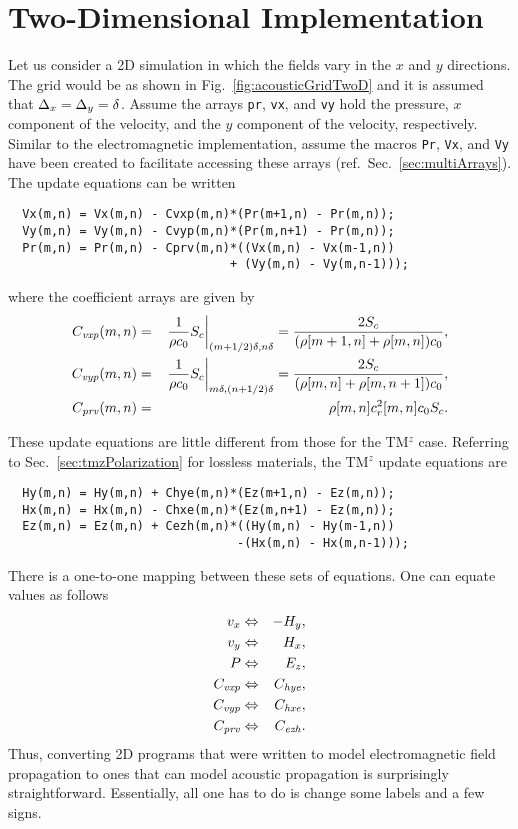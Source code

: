 \section{Two-Dimensional Implementation}

Let us consider a 2D simulation in which the fields vary in the $x$
and $y$ directions.  The grid would be as shown in Fig.\
\ref{fig:acousticGridTwoD} and it is assumed that $\Delta_x = \Delta_y =
\delta$.  Assume the arrays {\tt pr}, {\tt vx}, and {\tt vy} hold the
pressure, $x$ component of the velocity, and the $y$ component of the
velocity, respectively.  Similar to the electromagnetic
implementation, assume the macros {\tt Pr}, {\tt Vx}, and {\tt Vy}
have been created to facilitate accessing these arrays (ref.\ Sec.\
\ref{sec:multiArrays}).  The update equations can be written
\begin{verbatim}
  Vx(m,n) = Vx(m,n) - Cvxp(m,n)*(Pr(m+1,n) - Pr(m,n));
  Vy(m,n) = Vy(m,n) - Cvyp(m,n)*(Pr(m,n+1) - Pr(m,n));
  Pr(m,n) = Pr(m,n) - Cprv(m,n)*((Vx(m,n) - Vx(m-1,n)) 
                               + (Vy(m,n) - Vy(m,n-1)));
\end{verbatim}
where the coefficient arrays are given by
\begin{eqnarray}
  C_{\mathit{vxp}}(m,n) &=&
    \left.\frac{1}{\rho c_0} S_c\right|_{(m+1/2)\delta,n\delta} =
    \frac{2 S_c}{(\rho[m+1,n]+\rho[m,n]) c_0}, \\
  C_{\mathit{vyp}}(m,n) &=&
    \left.\frac{1}{\rho c_0} S_c\right|_{m\delta,(n+1/2)\delta} =
    \frac{2 S_c}{(\rho[m,n]+\rho[m,n+1]) c_0}, \\
  C_{\mathit{prv}}(m,n) &=& \rho[m,n] c_r^2[m,n] c_0 S_c.
\end{eqnarray}

These update equations are little different from those for the TM$^z$
case.  Referring to Sec.\ \ref{sec:tmzPolarization} for lossless
materials, the TM$^z$ update equations are
\begin{verbatim}
  Hy(m,n) = Hy(m,n) + Chye(m,n)*(Ez(m+1,n) - Ez(m,n));
  Hx(m,n) = Hx(m,n) - Chxe(m,n)*(Ez(m,n+1) - Ez(m,n));
  Ez(m,n) = Ez(m,n) + Cezh(m,n)*((Hy(m,n) - Hy(m-1,n))
                                -(Hx(m,n) - Hx(m,n-1)));
\end{verbatim}
There is a one-to-one mapping between these sets of equations.
One can equate values as follows
\begin{eqnarray}
  v_x &\Leftrightarrow& -H_y, \\
  v_y &\Leftrightarrow& H_x, \\
  P   &\Leftrightarrow& E_z,\\
  C_{\mathit{vxp}} &\Leftrightarrow& C_{\mathit{hye}}, \\
  C_{\mathit{vyp}} &\Leftrightarrow& C_{\mathit{hxe}}, \\
  C_{\mathit{prv}} &\Leftrightarrow& C_{\mathit{ezh}}.
\end{eqnarray}
Thus, converting 2D programs that were written to model
electromagnetic field propagation to ones that can model acoustic
propagation is surprisingly straightforward.  Essentially, all one has
to do is change some labels and a few signs.

